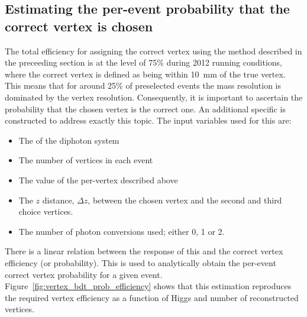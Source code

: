 \subsection{Estimating the per-event probability that the correct vertex is chosen}
\label{sec:bdt_prob}

The total efficiency for assigning the correct vertex using the method described in the preceeding section is at the level of 75\% during 2012 running conditions, where the correct vertex is defined as being within 10~mm of the true vertex. This means that for around 25\% of preselected events the mass resolution is dominated by the vertex resolution. Consequently, it is important to ascertain the probability that the chosen vertex is the correct one. An additional specific \BDT is constructed to address exactly this topic. The input variables used for this \BDT are:

\begin{itemize}
  \item The \pT of the diphoton system
  \item The number of vertices in each event
  \item The value of the per-vertex \BDT described above
  \item The $z$ distance, $\Delta z$, between the chosen vertex and the second and third choice vertices.
  \item The number of photon conversions used; either 0, 1 or 2.
\end{itemize}

There is a linear relation between the response of this \BDT and the correct vertex efficiency (or probability). This is used to analytically obtain the per-event correct vertex probability for a given event. Figure~\ref{fig:vertex_bdt_prob_efficiency} shows that this estimation reproduces the required vertex efficiency as a function of Higgs \pT and number of reconstructed vertices.

